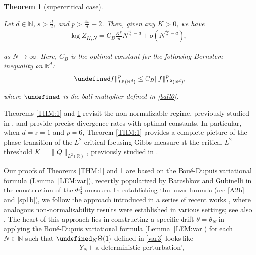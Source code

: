 \documentclass[letterpaper, 11pt,  reqno]{amsart}
\newtheorem{theorem}{Theorem} [section]
\newcommand{\noi}{\noindent}
\newcommand{\R}{\mathbb{R}}
\let\P= \undefined
\newcommand{\P}{\mathbf{P}}
\newcommand{\ta}{\theta}
\newcommand{\N}{\mathbb{N}}
\numberwithin{equation}{section}
\numberwithin{theorem}{section}
\newcommand{\Dr}{\Theta}
\begin{document}
\begin{theorem}[supercritical case]\label{THM:2}

Let $d \in \N$, $s > \frac d2$, and 
 $p>\frac{4s}{d}+2$.
 Then, given any $K > 0$, 
we have 
\begin{align*}
\log Z_{K, N}= C_B \frac{K^p}{p} N^{\frac{dp}{2}-d}+o(N^{\frac{dp}{2}-d}), 
\end{align*}


\noi
as $N\to \infty$.
Here,  $C_B$ is the optimal constant for the following Bernstein inequality on $\R^d$\textup{:}
\begin{align}\label{A4}
\|\P f\|^p_{L^{p}(\R^d)}\le C_B\|f\|^p_{L^{2}(\R^d)},
\end{align}

\noi
where  $\P$ is  the ball multiplier defined in  \eqref{ball0}.


\end{theorem}










Theorems \ref{THM:1} and \ref{THM:2}
revisit the non-normalizable regime, 
previously studied in 
 \cite{LRS, OST1, LW22}, 
and provide precise divergence rates
with optimal constants.
In particular, 
when 
 $d = s = 1$ and $p = 6$, 
 Theorem \ref{THM:1}
provides a complete picture of 
the  phase transition of the $L^2$-critical focusing Gibbs measure
at the critical $L^2$-threshold $K = \|Q\|_{L^2(\R)}$, 
previously studied in  \cite{LRS, OST1}. 




Our proofs of 
Theorems \ref{THM:1} and \ref{THM:2}
are based on the Bou\'e-Dupuis variational formula
(Lemma~\ref{LEM:var}), recently popularized by 
Barashkov and Gubinelli \cite{BG}
in the construction of the $\Phi^4_3$-measure.
In establishing the lower bounds (see  \eqref{A2b} and \eqref{sp1b}), 
we follow the approach introduced
in a series of recent works
\cite{TW23, OOT, OST, OOT21},   
where analogous
non-normalizability results were established in various settings;
see also 
\cite{LW22,  GOTT}.
The heart of this approach lies in 
constructing a specific drift $\ta = \ta_N$ 
in applying  
the Bou\'e-Dupuis variational formula (Lemma~\ref{LEM:var})
for each $N \in \N$
such that 
$\P_N \Dr (1)$ defined in \eqref{var3} looks like
\begin{align}
 \text{`$-Y_N$+ a deterministic perturbation',}
\label{A5}
\end{align}
\end{document}
